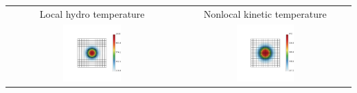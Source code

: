 \documentclass[8pt, compress]{beamer}
\begin{document}
\renewcommand{\fs}{0.35}
\begin{frame}
\begin{center}
\begin{tabular}{cc}
Local hydro temperature & Nonlocal kinetic temperature \\
\includegraphics[width=\fs\textwidth]{../figures/ALE_local_Te_2D_neconst.png}
&
\includegraphics[width=\fs\textwidth]{../figures/ALE_nonlocal_Te_2D_neconst.png}

\end{tabular}
\end{center}
\end{frame}
\end{document}
